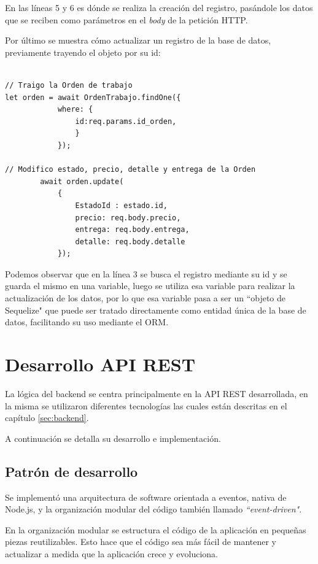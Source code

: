 En las líneas 5 y 6 es dónde se realiza la creación del registro, pasándole los datos que se reciben como parámetros en el \textit{body} de la petición HTTP.

Por último se muestra cómo actualizar un registro de la base de datos, previamente trayendo el objeto por su id:

\begin{lstlisting}[label=cod:updateregistro,caption=Código resumido para actualizar un registro en la base de datos.]

// Traigo la Orden de trabajo
let orden = await OrdenTrabajo.findOne({
            where: {
                id:req.params.id_orden,
                }
            });
            
// Modifico estado, precio, detalle y entrega de la Orden
        await orden.update(
            {
                EstadoId : estado.id,
                precio: req.body.precio,
                entrega: req.body.entrega,
                detalle: req.body.detalle
            });
\end{lstlisting}

Podemos observar que en la línea 3 se busca el registro mediante su id y se guarda el mismo en una variable, luego se utiliza esa variable para realizar la actualización de los datos, por lo que esa variable pasa a ser un ``objeto de Sequelize" que puede ser tratado directamente como entidad única de la base de datos, facilitando su uso mediante el ORM.


\section{Desarrollo API REST}
\label{sec:arquitecturaapirest}

La lógica del backend se centra principalmente en la API REST desarrollada, en la misma se utilizaron diferentes tecnologías las cuales están descritas en el capítulo \ref{sec:backend}.

A continuación se detalla su desarrollo e implementación.

\subsection{Patrón de desarrollo}
\label{subsec:apipatron}

Se implementó una arquitectura de software orientada a eventos, nativa de Node.js, y la organización modular del código también llamado \textit{``event-driven"}.

En la organización modular se estructura el código de la aplicación en pequeñas piezas reutilizables. Esto hace que el código sea más fácil de mantener y actualizar a medida que la aplicación crece y evoluciona.

